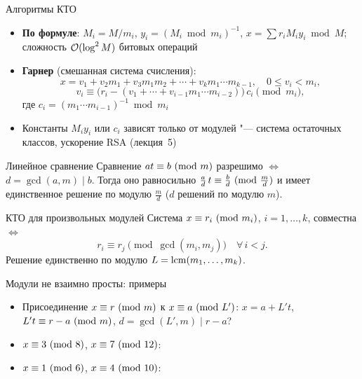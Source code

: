 \documentclass{ca-slides}
\begin{document}
\begin{canvasframe}{Алгоритмы КТО}
  \footnotesize
  \begin{itemize}
    \item \textbf{По формуле}: $M_i = M/m_i$, $y_i = (M_i \bmod m_i)^{-1}$,
      $x = \sum r_i M_i y_i \bmod M$; сложность $\mathcal{O}(\log^2 M)$ битовых операций
    \item \textbf{Гарнер} (смешанная система счисления):
      \[
        x = v_1 + v_2 m_1 + v_3 m_1 m_2 + \cdots + v_k m_1 \cdots m_{k-1}, \quad 0 \le v_i < m_i,
      \]
      \[
        v_i \equiv \bigl(r_i - (v_1 + \cdots + v_{i-1} m_1 \cdots m_{i-2})\bigr)\, c_i \pmod{m_i},
      \]
      где $c_i = (m_1 \cdots m_{i-1})^{-1} \bmod m_i$
    \item Константы $M_i y_i$ или $c_i$ зависят только от модулей "--- система остаточных
      классов, ускорение RSA (лекция~5)
  \end{itemize}
\end{canvasframe}

\begin{theoremframe}[lemma]{Линейное сравнение}
  Сравнение $at \equiv b \ (\mathrm{mod}\ m)$ разрешимо $\iff$ $d = \gcd(a, m) \mid b$. Тогда оно
  равносильно $\frac ad\, t \equiv \frac bd \ (\mathrm{mod}\ \frac md)$ и имеет единственное решение
  по модулю $\frac md$ ($d$ решений по модулю $m$).
\end{theoremframe}

\begin{theoremframe}{КТО для произвольных модулей}
  Система $x \equiv r_i \ (\mathrm{mod}\ m_i)$, $i = 1, \dots, k$, совместна $\iff$
  \[
    r_i \equiv r_j \pmod{\gcd(m_i, m_j)} \quad \forall\, i < j .
  \]
  Решение единственно по модулю $L = \operatorname{lcm}(m_1, \dots, m_k)$.
\end{theoremframe}

\begin{canvasframe}{Модули не взаимно просты: примеры}
  \begin{itemize}
    \item Присоединение $x \equiv r \ (\mathrm{mod}\ m)$ к $x \equiv a \ (\mathrm{mod}\ L')$:
      $x = a + L't$, \quad $L't \equiv r - a \ (\mathrm{mod}\ m)$, \quad $d = \gcd(L', m) \mid r - a$?
    \item $x \equiv 3 \ (\mathrm{mod}\ 8)$, $x \equiv 7 \ (\mathrm{mod}\ 12)$:
  \end{itemize}
  \penspace[0.17\textheight]
  \begin{itemize}
    \item $x \equiv 1 \ (\mathrm{mod}\ 6)$, $x \equiv 4 \ (\mathrm{mod}\ 10)$:
  \end{itemize}
  \penspace[0.08\textheight]
\end{canvasframe}
\end{document}
